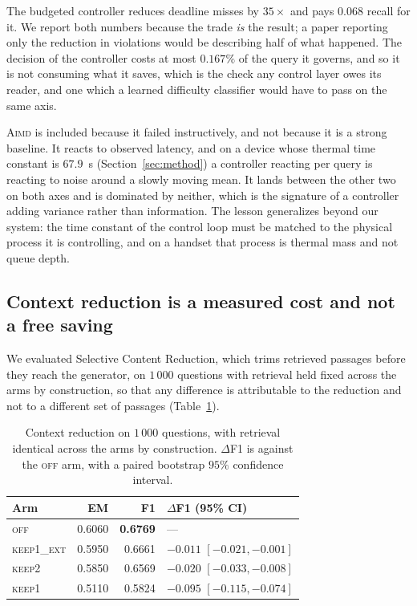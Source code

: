 \documentclass[journal]{IEEEtran}
\begin{document}
The budgeted controller reduces deadline misses by $35\times$ and pays
$0.068$ recall for it. We report both numbers because the trade \emph{is}
the result; a paper reporting only the reduction in violations would be
describing half of what happened. The decision of the controller costs at
most $0.167\%$ of the query it governs, and so it is not consuming what it
saves, which is the check any control layer owes its reader, and one which
a learned difficulty classifier would have to pass on the same axis.

\textsc{Aimd} is included because it failed instructively, and not because
it is a strong baseline. It reacts to observed latency, and on a device
whose thermal time constant is $67.9$~s (Section~\ref{sec:method}) a
controller reacting per query is reacting to noise around a slowly moving
mean. It lands between the other two on both axes and is dominated by
neither, which is the signature of a controller adding variance rather than
information. The lesson generalizes beyond our system: the time constant of
the control loop must be matched to the physical process it is controlling,
and on a handset that process is thermal mass and not queue depth.

\subsection{Context reduction is a measured cost and not a free saving}
\label{sec:scr}

We evaluated Selective Content Reduction, which trims retrieved passages
before they reach the generator, on $1\,000$ questions with retrieval held
fixed across the arms by construction, so that any difference is
attributable to the reduction and not to a different set of passages
(Table~\ref{tab:scr}).

\begin{table}[!t]
\caption{Context reduction on $1\,000$ questions, with retrieval identical
across the arms by construction. $\Delta$F1 is against the \textsc{off}
arm, with a paired bootstrap $95\%$ confidence interval.}
\label{tab:scr}
\centering
\begin{tabular}{lrrl}
\toprule
Arm & EM & F1 & $\Delta$F1 (95\% CI) \\
\midrule
\textsc{off}        & 0.6060 & \textbf{0.6769} & --- \\
\textsc{keep1\_ext} & 0.5950 & 0.6661 & $-0.011$ $[-0.021, -0.001]$ \\
\textsc{keep2}      & 0.5850 & 0.6569 & $-0.020$ $[-0.033, -0.008]$ \\
\textsc{keep1}      & 0.5110 & 0.5824 & $-0.095$ $[-0.115, -0.074]$ \\
\bottomrule
\end{tabular}
\end{table}
\end{document}
